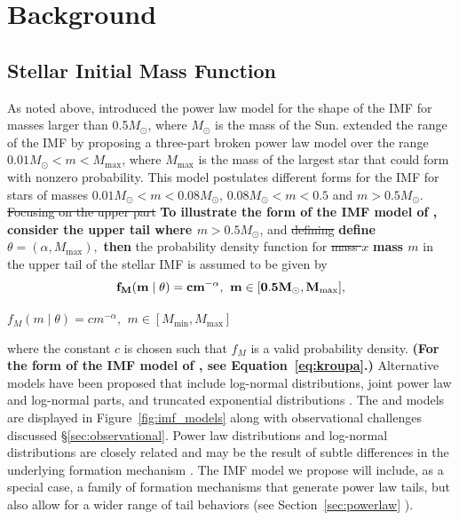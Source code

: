 \documentclass[ejs]{imsart}
\numberwithin{equation}{section}
\theoremstyle{plain}
\newcommand{\new}[1]{{\bf #1}}
\newcommand{\remove}[1]{\st{#1}}
\newcommand{\Msun}{M_{\odot}}
\newcommand{\Mmax}{M_{\text{max}}}
\newcommand{\Mmin}{M_{\text{min}}}
\begin{document}
\section{Background}
\label{sec:background}
\subsection{Stellar Initial Mass Function}

As noted above, \cite{salpeter55} introduced the power law model for the shape of the IMF for masses larger
than 0.5$\Msun$, where $\Msun$ is the mass of the Sun.
\cite{kroupa2001} extended the range of the IMF by proposing a three-part broken power law model 
over the range $0.01 \Msun < m < \Mmax$, where $\Mmax$ is the mass of the largest star that could form with nonzero probability.
This model postulates different forms for the IMF for stars of masses $0.01 \Msun < m < 0.08 \Msun$,
$0.08 \Msun < m < 0.5$ and $m > 0.5\Msun$.
\remove{Focusing on the upper part} \new{To illustrate the form of the IMF model of \cite{salpeter55}, consider the upper tail where $m > 0.5\Msun$}, and \remove{defining} \new{define} $\theta = (\alpha, \Mmax),$ \new{then} the probability density function for \remove{mass $x$} \new{ mass $m$} in the upper tail of the stellar IMF is assumed to be given by
\begin{align}
{\bf	f_M(m \mid \theta) = cm^{-\alpha}\text{,}\;\; m \in [0.5\Msun, \Mmax]\text{,}}
	\label{eq:imf}
\end{align}

\remove{$f_M(m \mid \theta) = cm^{-\alpha}\text{,}\;\; m \in [\Mmin, \Mmax]$}

\noindent where the constant $c$ is chosen such that $f_M$ is a valid probability density.  
\new{(For the form of the IMF model of \cite{kroupa2001}, see Equation~\eqref{eq:kroupa}.)}
Alternative models have been proposed that include log-normal distributions, joint power law and log-normal parts, and truncated exponential distributions  \citep{Chabrier:2003oq, Chabrier:2003om, chabrier2005,IMF50,bastian2010, OffnerEtAl2014}.  The \cite{kroupa2001} and \cite{Chabrier:2003oq, Chabrier:2003om} models are displayed in Figure~\ref{fig:imf_models} along with observational challenges discussed \S\ref{sec:observational}.
Power law distributions and log-normal distributions are closely related and may be the result of subtle differences in the underlying formation mechanism \citep{Mitzenmacher2004}.  
The IMF model we propose will include, as a special case, a family of formation mechanisms that generate
power law tails, but also allow for a wider range of tail behaviors (see Section~\ref{sec:powerlaw} ).
\end{document}

